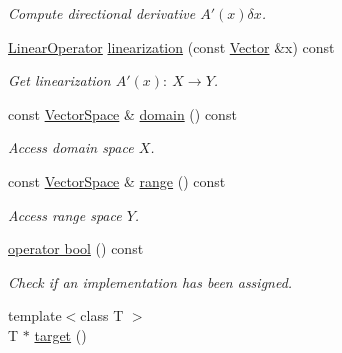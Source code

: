 \begin{DoxyCompactItemize}
\begin{DoxyCompactList}\small\item\em Compute directional derivative $A'(x)\delta x$. \end{DoxyCompactList}\item 
\hypertarget{classSpacy_1_1C1Operator_a71aabe09ec29a8a1bb197eef035d6672}{}\hyperlink{classSpacy_1_1LinearOperator}{Linear\+Operator} \hyperlink{classSpacy_1_1C1Operator_a71aabe09ec29a8a1bb197eef035d6672}{linearization} (const \hyperlink{classSpacy_1_1Vector}{Vector} \&x) const \label{classSpacy_1_1C1Operator_a71aabe09ec29a8a1bb197eef035d6672}

\begin{DoxyCompactList}\small\item\em Get linearization $A'(x):\ X\to Y $. \end{DoxyCompactList}\item 
\hypertarget{classSpacy_1_1C1Operator_aee0ffd5cee0b8a8df2f0b67b5aaf0ddb}{}const \hyperlink{classSpacy_1_1VectorSpace}{Vector\+Space} \& \hyperlink{classSpacy_1_1C1Operator_aee0ffd5cee0b8a8df2f0b67b5aaf0ddb}{domain} () const \label{classSpacy_1_1C1Operator_aee0ffd5cee0b8a8df2f0b67b5aaf0ddb}

\begin{DoxyCompactList}\small\item\em Access domain space $X$. \end{DoxyCompactList}\item 
\hypertarget{classSpacy_1_1C1Operator_a7df27427591907b13776e7ba3707bf05}{}const \hyperlink{classSpacy_1_1VectorSpace}{Vector\+Space} \& \hyperlink{classSpacy_1_1C1Operator_a7df27427591907b13776e7ba3707bf05}{range} () const \label{classSpacy_1_1C1Operator_a7df27427591907b13776e7ba3707bf05}

\begin{DoxyCompactList}\small\item\em Access range space $Y$. \end{DoxyCompactList}\item 
\hypertarget{classSpacy_1_1C1Operator_abe1b0f89dd816e24d7b2525598d95652}{}\hyperlink{classSpacy_1_1C1Operator_abe1b0f89dd816e24d7b2525598d95652}{operator bool} () const \label{classSpacy_1_1C1Operator_abe1b0f89dd816e24d7b2525598d95652}

\begin{DoxyCompactList}\small\item\em Check if an implementation has been assigned. \end{DoxyCompactList}\item 
\hypertarget{structSpacy_1_1Mixin_1_1ToTarget_a3510786172c63a074eda127276d13392}{}{\footnotesize template$<$class T $>$ }\\T $\ast$ \hyperlink{structSpacy_1_1Mixin_1_1ToTarget_a3510786172c63a074eda127276d13392}{target} ()\label{structSpacy_1_1Mixin_1_1ToTarget_a3510786172c63a074eda127276d13392}


\end{DoxyCompactItemize}
